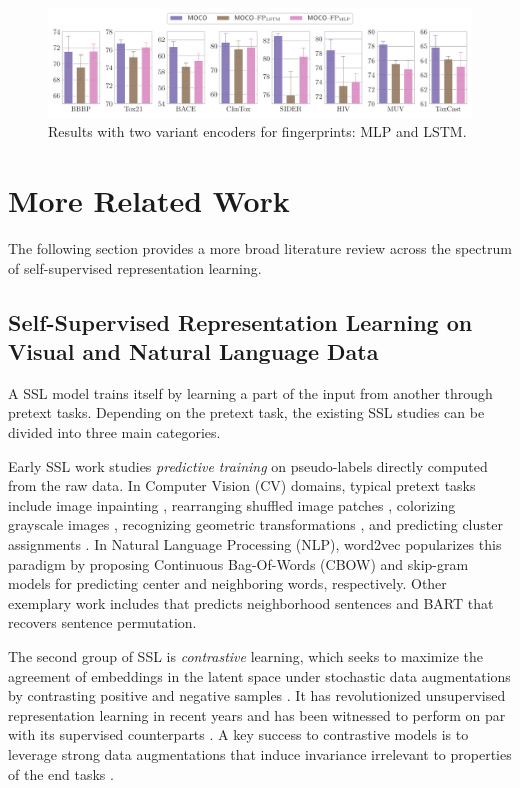 \begin{figure}
	\centering
	\includegraphics[width=\linewidth]{figures/fpvariants.pdf}
	\caption{Results with two variant encoders for fingerprints: MLP and LSTM.}
	\label{fig:fp-variants}
\end{figure}

\section{More Related Work}
\label{supp:related-work}

The following section provides a more broad literature review across the spectrum of self-supervised representation learning.

\subsection{Self-Supervised Representation Learning on Visual and Natural Language Data}

A SSL model trains itself by learning a part of the input from another through pretext tasks.
Depending on the pretext task, the existing SSL studies can be divided into three main categories.

Early SSL work studies \emph{predictive training} on pseudo-labels directly computed from the raw data.
In Computer Vision (CV) domains, typical pretext tasks include image inpainting \cite{Pathak:2016gb}, rearranging shuffled image patches \cite{Noroozi:2016hd}, colorizing grayscale images \cite{Zhang:2016fr,Larsson:2017vt}, recognizing geometric transformations \cite{Gidaris:2018wr}, and predicting cluster assignments \cite{Caron:2018ba}.
In Natural Language Processing (NLP), word2vec \cite{Mikolov:2013uz} popularizes this paradigm by proposing Continuous Bag-Of-Words (CBOW) and skip-gram models for predicting center and neighboring words, respectively.
Other exemplary work includes \citet{Kiros:2015uq} that predicts neighborhood sentences and BART \cite{Lewis:2020il} that recovers sentence permutation.

The second group of SSL is \emph{contrastive} learning, which seeks to maximize the agreement of embeddings in the latent space under stochastic data augmentations by contrasting positive and negative samples \cite{Jing:2021cf}.
It has revolutionized unsupervised representation learning in recent years \cite{vandenOord:2018ut,Bachman:2019wp,He:2020tu,Chen:2020wj,Caron:2020uv,Chen:2021ci,Gao:2021wf} and has been witnessed to perform on par with its supervised counterparts \cite{He:2020tu,Chen:2020wj}.
A key success to contrastive models is to leverage strong data augmentations that induce invariance irrelevant to properties of the end tasks \cite{Xiao:2021vt,Tian:2020vw,Purushwalkam:2020wm,vonKugelgen:2021wb}.

